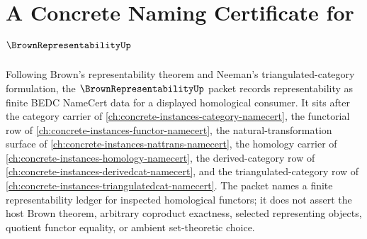 \chapter{A Concrete Naming Certificate for $\BrownRepresentabilityUp$}
\label{ch:concrete-instances-brown-representability-namecert}

Following Brown's representability theorem and Neeman's triangulated-category formulation, the $\BrownRepresentabilityUp$ packet records representability as finite BEDC NameCert data for a displayed homological consumer. It sits after the category carrier of \autoref{ch:concrete-instances-category-namecert}, the functorial row of \autoref{ch:concrete-instances-functor-namecert}, the natural-transformation surface of \autoref{ch:concrete-instances-nattrans-namecert}, the homology carrier of \autoref{ch:concrete-instances-homology-namecert}, the derived-category row of \autoref{ch:concrete-instances-derivedcat-namecert}, and the triangulated-category row of \autoref{ch:concrete-instances-triangulatedcat-namecert}. The packet names a finite representability ledger for inspected homological functors; it does not assert the host Brown theorem, arbitrary coproduct exactness, selected representing objects, quotient functor equality, or ambient set-theoretic choice.


